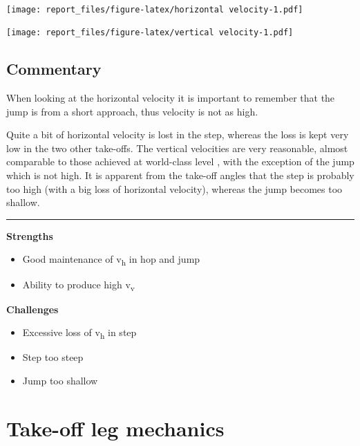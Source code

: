 \documentclass[]{scrreprt}
\providecommand{\tightlist}{%
  \setlength{\itemsep}{0pt}\setlength{\parskip}{0pt}}
\begin{document}
~

\texttt{[image: report\_files/figure-latex/horizontal velocity-1.pdf]}
~

\texttt{[image: report\_files/figure-latex/vertical velocity-1.pdf]}
~

\hypertarget{commentary-1}{%
\subsection{Commentary}\label{commentary-1}}

When looking at the horizontal velocity it is important to remember that the jump is from a short approach, thus velocity is not as high.

Quite a bit of horizontal velocity is lost in the step, whereas the loss is kept very low in the two other take-offs. The vertical velocities are very reasonable, almost comparable to those achieved at world-class level \autocites{Miller1986}{Allen2013}, with the exception of the jump which is not high. It is apparent from the take-off angles that the step is probably too high (with a big loss of horizontal velocity), whereas the jump becomes too shallow.

\begin{center}\rule{0.5\linewidth}{0.5pt}\end{center}

\textbf{Strengths}

\begin{itemize}
\tightlist
\item
  Good maintenance of v\textsubscript{h} in hop and jump
\item
  Ability to produce high v\textsubscript{v}
\end{itemize}

\textbf{Challenges}

\begin{itemize}
\tightlist
\item
  Excessive loss of v\textsubscript{h} in step
\item
  Step too steep
\item
  Jump too shallow
\end{itemize}

\clearpage

\hypertarget{take-off-leg-mechanics-1}{%
\section{Take-off leg mechanics}\label{take-off-leg-mechanics-1}}
\end{document}
